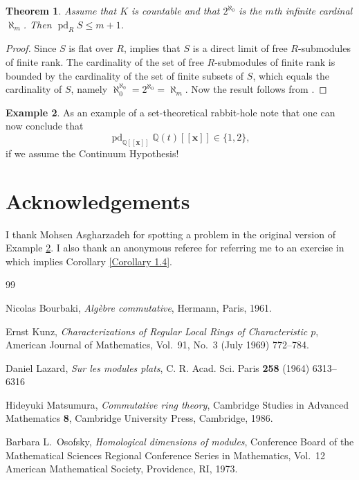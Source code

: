 \documentclass[12pt]{amsart}
\theoremstyle{plain}%
\newtheorem{thm}{Theorem}[section]
\theoremstyle{definition}
\newtheorem{ex}[thm]{Example}
\theoremstyle{remark}
\DeclareMathOperator{\pd}{pd}
\def\Q{{\mathbb{Q}}}
\begin{document}
\begin{thm}
Assume that $K$ is countable and that
$2^{\aleph_0}$ is the $m$th infinite cardinal $\aleph_m$.
Then $\pd_R S\leq m+1$.
\end{thm}
\begin{proof}
Since $S$ is flat over $R$,
\cite[Th\'{e}or\`{e}me 1.2]{Lazard}
implies that $S$ is a direct limit
of free $R$-submodules of
finite rank.
The cardinality of the set of free $R$-submodules of
finite rank is bounded by the cardinality of the
set of finite subsets of $S$, which equals the cardinality of
$S$, namely $\aleph_0^{\aleph_0}=2^{\aleph_0}=\aleph_m$.
Now the result follows from \cite[Theorem 2.44]{Osofsky}.
\end{proof}

\begin{ex}\label{Example 2.3}
As an example of a set-theoretical rabbit-hole note that
one can now conclude that
\[
 \pd_{\Q[\![\mathbf{x}]\!]} \Q(t)[\![\mathbf{x}]\!]\in\{1,2\},
\]
if we assume the Continuum Hypothesis!
\end{ex}


\section*{Acknowledgements}

I thank Mohsen Asgharzadeh for spotting a problem in the original version of Example \ref{Example 2.3}. I also thank an anonymous referee for referring me to an exercise in \cite{Bourbaki} which implies Corollary \ref{Corollary 1.4}.



\begin{thebibliography}{99}

Nicolas Bourbaki, \emph{{A}lg\`ebre commutative},
Hermann, Paris, 1961.


Ernst Kunz, \emph{Characterizations of Regular Local Rings of Characteristic $p$},
American Journal of Mathematics, Vol.~91, No.~3 (July 1969) 772--784.

Daniel Lazard,
\emph{Sur les modules plats},
C. R. Acad. Sci. Paris {\bf 258} (1964) 6313--6316

Hideyuki Matsumura, \emph{Commutative ring theory},
Cambridge Studies in Advanced Mathematics {\bf 8},
Cambridge University Press, Cambridge, 1986.

Barbara L.~Osofsky,
\emph{Homological dimensions of modules},
Conference Board of the Mathematical Sciences Regional
Conference Series in Mathematics, Vol.~12
American Mathematical Society, Providence, RI,
1973.

\end{thebibliography}
\end{document}
